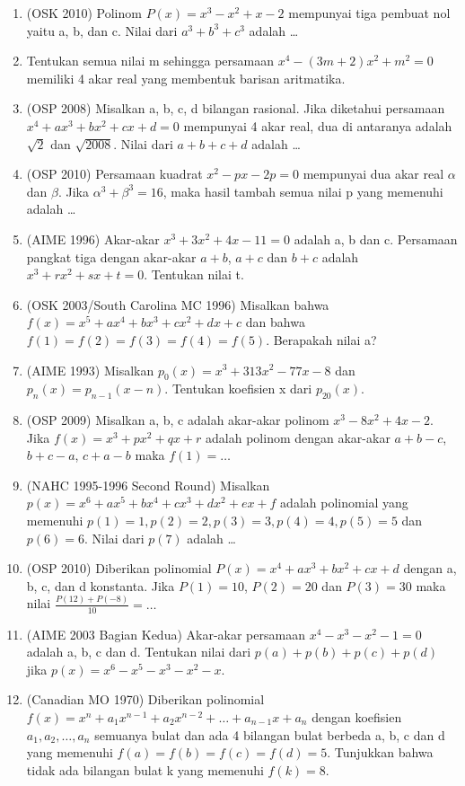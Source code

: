 \documentclass[12pt]{scrartcl}
\theoremstyle{definition}
\begin{document}
\begin{enumerate}
    \item (OSK 2010) Polinom $P(x)=x^3-x^2+x-2$ mempunyai tiga pembuat nol yaitu a, b, dan c. Nilai dari $a^3+b^3+c^3$ adalah \dots
    
    \item Tentukan semua nilai m sehingga persamaan $x^4 - (3m+2)x^2 + m^2 = 0$ memiliki 4 akar real yang membentuk barisan aritmatika.
    
    \item (OSP 2008) Misalkan a, b, c, d bilangan rasional. Jika diketahui persamaan $x^4+ax^3+bx^2+cx+d=0$ mempunyai 4 akar real, dua di antaranya adalah $\sqrt{2}$ dan $\sqrt{2008}$. Nilai dari $a+b+c+d$ adalah \dots
    
    \item (OSP 2010) Persamaan kuadrat $x^2-px-2p=0$ mempunyai dua akar real $\alpha$ dan $\beta$. Jika $\alpha^3+\beta^3=16$, maka hasil tambah semua nilai p yang memenuhi adalah \dots
    
    \item (AIME 1996) Akar-akar $x^3+3x^2+4x-11=0$ adalah a, b dan c. Persamaan pangkat tiga dengan akar-akar $a+b$, $a+c$ dan $b+c$ adalah $x^3+rx^2+sx+t=0$. Tentukan nilai t.
    
    \item (OSK 2003/South Carolina MC 1996) Misalkan bahwa $f(x) = x^5+ax^4+bx^3+cx^2+dx+c$ dan bahwa $f(1)=f(2)=f(3)=f(4)=f(5)$. Berapakah nilai a?
    
    \item (AIME 1993) Misalkan $p_0(x)=x^3+313x^2-77x-8$ dan $p_n(x)=p_{n-1}(x-n)$. Tentukan koefisien x dari $p_{20}(x)$.
    
    \item (OSP 2009) Misalkan a, b, c adalah akar-akar polinom $x^3-8x^2+4x-2$. Jika $f(x)=x^3+px^2+qx+r$ adalah polinom dengan akar-akar $a+b-c$, $b+c-a$, $c+a-b$ maka $f(1) = \dots$
    
    \item (NAHC 1995-1996 Second Round) Misalkan $p(x) = x^6+ax^5+bx^4+cx^3+dx^2+ex+f$ adalah polinomial yang memenuhi $p(1)=1, p(2)=2, p(3)=3, p(4)=4, p(5)=5$ dan $p(6)=6$. Nilai dari $p(7)$ adalah \dots
    
    \item (OSP 2010) Diberikan polinomial $P(x)=x^4+ax^3+bx^2+cx+d$ dengan a, b, c, dan d konstanta. Jika $P(1)=10$, $P(2)=20$ dan $P(3)=30$ maka nilai $\frac{P(12)+P(-8)}{10} = \dots$
    
    \item (AIME 2003 Bagian Kedua) Akar-akar persamaan $x^4-x^3-x^2-1=0$ adalah a, b, c dan d. Tentukan nilai dari $p(a)+p(b)+p(c)+p(d)$ jika $p(x)=x^6-x^5-x^3-x^2-x$.
    
    \item (Canadian MO 1970) Diberikan polinomial $f(x) = x^n+a_1 x^{n-1}+a_2 x^{n-2}+\dots+a_{n-1}x+a_n$ dengan koefisien $a_1, a_2, \dots, a_n$ semuanya bulat dan ada 4 bilangan bulat berbeda a, b, c dan d yang memenuhi $f(a)=f(b)=f(c)=f(d)=5$. Tunjukkan bahwa tidak ada bilangan bulat k yang memenuhi $f(k)=8$.
\end{enumerate}
\end{document}
